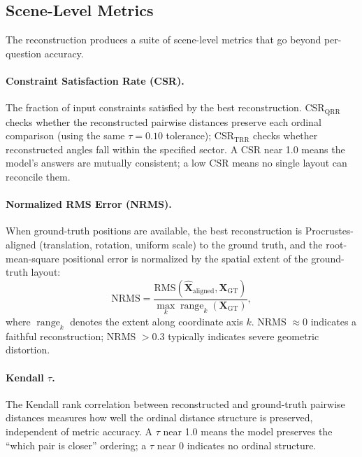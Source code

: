 \subsection{Scene-Level Metrics}
\label{sec:recon-metrics}

The reconstruction produces a suite of scene-level metrics that go beyond per-question accuracy.

\paragraph{Constraint Satisfaction Rate (CSR).}
The fraction of input constraints satisfied by the best reconstruction. CSR$_{\mathrm{QRR}}$ checks whether the reconstructed pairwise distances preserve each ordinal comparison (using the same $\tau = 0.10$ tolerance); CSR$_{\mathrm{TRR}}$ checks whether reconstructed angles fall within the specified sector. A CSR near 1.0 means the model's answers are mutually consistent; a low CSR means no single layout can reconcile them.

\paragraph{Normalized RMS Error (NRMS).}
When ground-truth positions are available, the best reconstruction is Procrustes-aligned (translation, rotation, uniform scale) to the ground truth, and the root-mean-square positional error is normalized by the spatial extent of the ground-truth layout:
\begin{equation}
  \mathrm{NRMS} = \frac{\mathrm{RMS}(\hat{\mathbf{X}}_{\mathrm{aligned}}, \mathbf{X}_{\mathrm{GT}})}{\max_k \operatorname{range}_k(\mathbf{X}_{\mathrm{GT}})},
  \label{eq:nrms}
\end{equation}
where $\operatorname{range}_k$ denotes the extent along coordinate axis $k$. NRMS $\approx 0$ indicates a faithful reconstruction; NRMS $> 0.3$ typically indicates severe geometric distortion.

\paragraph{Kendall $\tau$.}
The Kendall rank correlation between reconstructed and ground-truth pairwise distances measures how well the ordinal distance structure is preserved, independent of metric accuracy. A $\tau$ near 1.0 means the model preserves the ``which pair is closer'' ordering; a $\tau$ near 0 indicates no ordinal structure.

